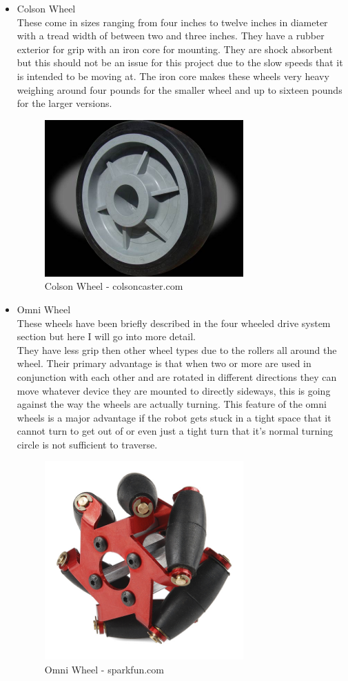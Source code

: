 \begin{itemize}
\item Colson Wheel
\\These come in sizes ranging from four inches to twelve inches in diameter with a tread width of between two and three inches.  They have a rubber exterior for grip with an iron core for mounting.  They are shock absorbent but this should not be an issue for this project due to the slow speeds that it is intended to be moving at.  The iron core makes these wheels very heavy weighing around four pounds for the smaller wheel and up to sixteen pounds for the larger versions.
\begin{figure}[H]
\centering
        \includegraphics[width=3.0in]  {Images/colson.jpg}
        \caption{Colson Wheel - colsoncaster.com}
        \label{Colson Wheel}
\end{figure}
\item Omni Wheel
\\These wheels have been briefly described in the four wheeled drive system section but here I will go into more detail.
\\They have less grip then other wheel types due to the rollers all around the wheel.  Their primary advantage is that when two or more are used in conjunction with each other and are rotated in different directions they can move whatever device they are mounted to directly sideways, this is going against the way the wheels are actually turning.  This feature of the omni wheels is a major advantage if the robot gets stuck in a tight space that it cannot turn to get out of or even just a tight turn that it's normal turning circle is not sufficient to traverse.
\begin{figure}[H]
\centering
        \includegraphics[width=3.0in] {Images/mechanum.jpg}
        \caption{Omni Wheel - sparkfun.com}
        \label{Omni Wheel}
\end{figure}

\end{itemize}
